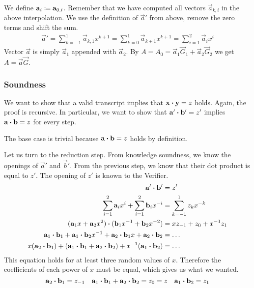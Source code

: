 %
We define $\mathbf{a}_i \coloneqq \mathbf{a}_{0, i}$.
Remember that we have computed all vectors $\vec{a}_{k, i}$ in the above interpolation.
%
We use the definition of $\vec{a}'$ from above,
remove the zero terms and shift the sum.
%
\begin{align*}
    \vec{a}' = \sum^{1}_{k = -1} \vec{a}_{k, 1} x^{k + 1} = \sum^{1}_{k = 0} \vec{a}_{k + 1} x^{k + 1} = \sum^2_{i = 1} \vec{a}_i x^i
\end{align*}
%
Vector $\vec{a}$ is simply $\vec{a}_1$ appended with $\vec{a}_2$.
By $A = A_0 = \vec{a}_1 \vec{G}_1 + \vec{a}_2 \vec{G}_2$ we get $A = \vec{a}\vec{G}$.

\subsubsection{Soundness}

We want to show that a valid transcript implies that $\mathbf{x} \boldsymbol{\cdot} \mathbf{y} = z$ holds.
Again, the proof is recursive.
In particular,
we want to show that $\mathbf{a}' \boldsymbol{\cdot} \mathbf{b}' = z'$ implies $\mathbf{a} \boldsymbol{\cdot} \mathbf{b} = z$ for every step.

The base case is trivial because $\mathbf{a} \boldsymbol{\cdot} \mathbf{b} = z$ holds by definition.

Let us turn to the reduction step.
%
From knowledge soundness,
we know the openings of $\vec{a}'$ and $\vec{b}'$.
From the previous step,
we know that their dot product is equal to $z'$.
The opening of $z'$ is known to the Verifier.
%
\begin{align*}
    \mathbf{a}' \boldsymbol{\cdot} \mathbf{b}' &= z' \\
    \sum^2_{i = 1} \mathbf{a}_i x^i + \sum^2_{i = 1} \mathbf{b}_i x^{-i} &= \sum^1_{k = -1} z_k x^{-k} \\
    (\mathbf{a}_1x + \mathbf{a}_2x^2) \boldsymbol{\cdot} (\mathbf{b}_1 x^{-1} + \mathbf{b}_2 x^{-2}) &= xz_{-1} + z_0 + x^{-1}z_1 \\
    \mathbf{a}_1 \boldsymbol{\cdot} \mathbf{b}_1 + \mathbf{a}_1 \boldsymbol{\cdot} \mathbf{b}_2 x^{-1} + \mathbf{a}_2 \boldsymbol{\cdot} \mathbf{b}_1 x + \mathbf{a}_2 \boldsymbol{\cdot} \mathbf{b}_2 &= \ldots \\
    x(\mathbf{a}_2 \boldsymbol{\cdot} \mathbf{b}_1) + (\mathbf{a}_1 \boldsymbol{\cdot} \mathbf{b}_1 + \mathbf{a}_2 \boldsymbol{\cdot} \mathbf{b}_2) + x^{-1} (\mathbf{a}_1 \boldsymbol{\cdot} \mathbf{b}_2) &= \ldots
\end{align*}
%
This equation holds for at least three random values of $x$.
Therefore the coefficients of each power of $x$ must be equal,
which gives us what we wanted.
%
\[
    \mathbf{a}_2 \boldsymbol{\cdot} \mathbf{b}_1 = z_{-1} \quad \mathbf{a}_1 \boldsymbol{\cdot} \mathbf{b}_1 + \mathbf{a}_2 \boldsymbol{\cdot} \mathbf{b}_2 = z_0 = z \quad \mathbf{a}_1 \boldsymbol{\cdot} \mathbf{b}_2 = z_1
\]
